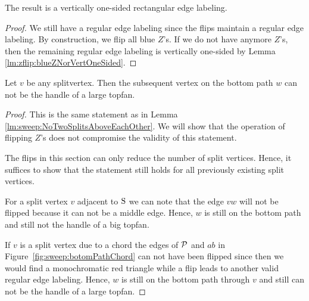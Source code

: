   \begin{lemma}
    \label{lm:sweep:vertOnsided}
    The result is a vertically one-sided rectangular edge labeling.
  \end{lemma}
  \begin{proof}
    We still have a regular edge labeling since the flips maintain a regular edge labeling.
    By construction, we flip all blue $Z$'s. If we do not have anymore $Z$'s, then the remaining regular edge labeling is vertically one-sided by Lemma \ref{lm:zflip:blueZNorVertOneSided}.
  \end{proof}

  \begin{lemma}
    \label{lm:zflip:NoTwoSplitsAboveEachOtherVertOnesided}
    Let $v$ be any splitvertex. Then the subsequent vertex on the bottom path $w$ can not be the handle of a large topfan.
  \end{lemma}

  \begin{proof}
    This is the same statement as in Lemma \ref{lm:sweep:NoTwoSplitsAboveEachOther}. We will show that the operation of flipping $Z$'s does not compromise the validity of this statement.

    The flips in this section can only reduce the number of split vertices.
    Hence, it suffices to show that the statement still holds for all previously existing split vertices.

    For a split vertex $v$ adjacent to $\pS$ we can note that the edge $vw$ will not be flipped because it can not be a middle edge.
    Hence, $w$ is still on the bottom path and still not the handle of a big topfan.

    If $v$ is a split vertex due to a chord the edges of $\P$ and $ab$ in Figure~\ref{fig:sweep:botomPathChord} can not have been flipped since then we would find a monochromatic red triangle while a flip leads to another valid regular edge labeling.
    Hence, $w$ is still on the bottom path through $v$ and still can not be the handle of a large topfan.
  \end{proof}
